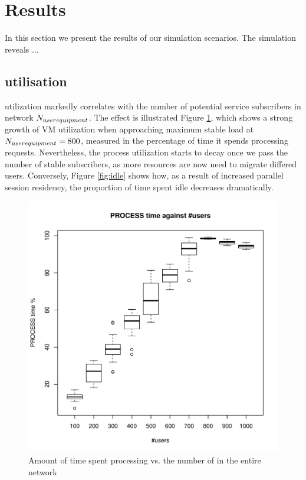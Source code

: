 \section{Results}
\label{sec:results}
In this section we present the results of our simulation scenarios. The simulation reveals ...

\subsection{\Dc{} utilisation}
\Dc utilization markedly correlates with the number of potential service subscribers in network $N_{user equipment}$. The effect is illustrated Figure \ref{fig:process}, which shows a strong growth of VM utilization when approaching maximum stable load at $N_{user equipment}=800$, measured in the percentage of time it spends processing requests. Nevertheless, the process utilization starts to decay once we pass the number of stable subscribers, as more resources are now need to migrate differed users. Conversely, Figure \ref{fig:idle} shows how, as a result of increased parallel session residency, the proportion of time spent idle decreases dramatically.

\begin{figure}[tb]
	\centering
	\includegraphics[width=\linewidth]{PROCESS.pdf} 
	\caption{Amount of time spent processing vs. the number of \ues in the entire network}
	\label{fig:process}
\end{figure}

